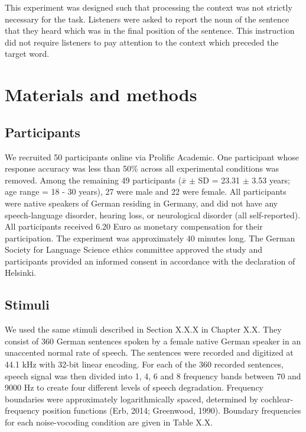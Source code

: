 \documentclass[a4paper, nobind]{templates/ociamthesis}
\begin{document}
This experiment was designed such that processing the context was not strictly necessary for the task.
Listeners were asked to report the noun of the sentence that they heard which was in the final position of the sentence.
This instruction did not require listeners to pay attention to the context which preceded the target word.

\hypertarget{materials-and-methods}{%
\section{Materials and methods}\label{materials-and-methods}}

\hypertarget{participants}{%
\subsection{Participants}\label{participants}}

We recruited 50 participants online via Prolific Academic.
One participant whose response accuracy was less than 50\% across all experimental conditions was removed.
Among the remaining 49 participants (\(\bar{x}\) \(\pm\) SD = 23.31 \(\pm\) 3.53 years; age range = 18 - 30 years), 27 were male and 22 were female.
All participants were native speakers of German residing in Germany, and did not have any speech-language disorder, hearing loss, or neurological disorder (all self-reported).
All participants received 6.20 Euro as monetary compensation for their participation.
The experiment was approximately 40 minutes long.
The German Society for Language Science ethics committee approved the study and participants provided an informed consent in accordance with the declaration of Helsinki.

\hypertarget{stimuli}{%
\subsection{Stimuli}\label{stimuli}}

We used the same stimuli described in Section X.X.X in Chapter X.X.
They consist of 360 German sentences spoken by a female native German speaker in an unaccented normal rate of speech.
The sentences were recorded and digitized at 44.1 kHz with 32-bit linear encoding.
For each of the 360 recorded sentences, speech signal was then divided into 1, 4, 6 and 8 frequency bands between 70 and 9000 Hz to create four different levels of speech degradation.
Frequency boundaries were approximately logarithmically spaced, determined by cochlear-frequency position functions (Erb, 2014; Greenwood, 1990).
Boundary frequencies for each noise-vocoding condition are given in Table X.X.
\end{document}
